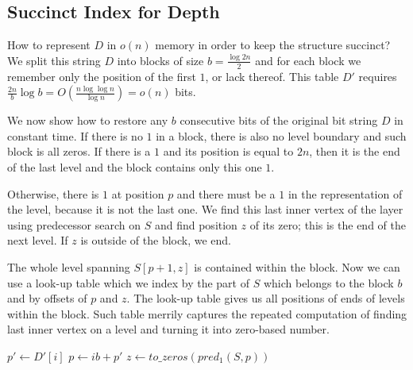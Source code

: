 \begin{algorithmic}
	\State {}
\EndFunction
\end{algorithmic}

\subsection{Succinct Index for Depth}

How to represent $D$ in $o(n)$ memory in order to keep the structure succinct?
We split this string $D$ into blocks of size $b = \frac{\log 2n}{2}$ and for each block we remember only the position of the first $1$, or lack thereof.
This table $D'$ requires $\frac{2n}{b} \log b = O(\frac{n \log\log n}{\log n}) = o(n)$ bits.

We now show how to restore any $b$ consecutive bits of the original bit string $D$ in constant time.
If there is no $1$ in a block, there is also no level boundary and such block is all zeros.
If there is a $1$ and its position is equal to $2n$, then it is the end of the last level and the block contains only this one $1$.

Otherwise, there is $1$ at position $p$ and there must be a $1$ in the representation of the level, because it is not the last one.
We find this last inner vertex of the layer using predecessor search on $S$ and find position $z$ of its zero; this is the end of the next level.
If $z$ is outside of the block, we end.

The whole level spanning $S[p+1, z]$ is contained within the block.
Now we can use a look-up table which we index by the part of $S$ which belongs to the block $b$ and by offsets of $p$ and $z$.
The look-up table gives us all positions of ends of levels within the block.
Such table merrily captures the repeated computation of finding last inner vertex on a level and turning it into zero-based number.

\begin{algorithmic}
	\State $p' \gets D'[i]$
	 
		\State {}
	\Else
		\State $p \gets i b + p'$
		 
			\State {} 
		\Else
			\State $z \gets to\_zeros(pred_1(S, p))$
			 
				\State {}
			\Else
				\State {}
			\EndIf
		\EndIf
	\EndIf
\EndFunction
\end{algorithmic}

